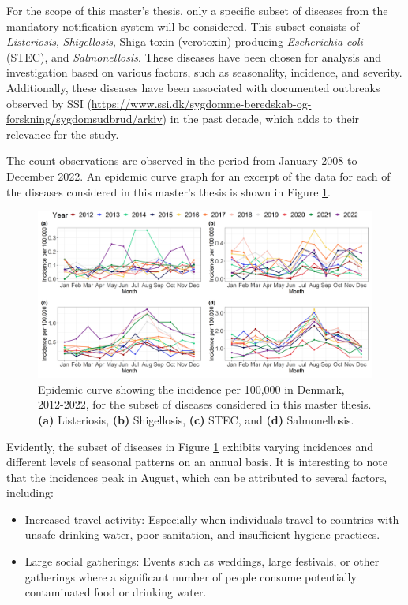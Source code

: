 \documentclass[a4paper,twoside,11pt]{report} %
\theoremstyle{definition}
\theoremstyle{definition}
\theoremstyle{definition}
\theoremstyle{definition}
\theoremstyle{remark}
\begin{document}
For the scope of this master's thesis, only a specific subset of diseases from the mandatory notification system will be considered. This subset consists of \textit{Listeriosis}, \textit{Shigellosis}, Shiga toxin (verotoxin)-producing \textit{Escherichia coli} (STEC), and \textit{Salmonellosis}. These diseases have been chosen for analysis and investigation based on various factors, such as seasonality, incidence, and severity. Additionally, these diseases have been associated with documented outbreaks observed by SSI (\href{https://www.ssi.dk/sygdomme-beredskab-og-forskning/sygdomsudbrud/arkiv}{https://www.ssi.dk/sygdomme-beredskab-og-forskning/sygdomsudbrud/arkiv}) in the past decade, which adds to their relevance for the study.

The count observations are observed in the period from January 2008 to December 2022. An epidemic curve graph for an excerpt of the data for each of the diseases considered in this master's thesis is shown in Figure \ref{fig:EpiPlot}.



\begin{figure}[H]
\includegraphics[width=1\linewidth]{../figures/EpiPlot} \caption{Epidemic curve showing the incidence per 100,000 in Denmark, 2012-2022, for the subset of diseases considered in this master thesis. \textbf{(a)} Listeriosis, \textbf{(b)} Shigellosis, \textbf{(c)} STEC, and \textbf{(d)} Salmonellosis.}\label{fig:EpiPlot}
\end{figure}

Evidently, the subset of diseases in Figure \ref{fig:EpiPlot} exhibits varying incidences and different levels of seasonal patterns on an annual basis. It is interesting to note that the incidences peak in August, which can be attributed to several factors, including:

\begin{itemize}
\item Increased travel activity: Especially when individuals travel to countries with unsafe drinking water, poor sanitation, and insufficient hygiene practices.
\item Large social gatherings: Events such as weddings, large festivals, or other gatherings where a significant number of people consume potentially contaminated food or drinking water.
\end{itemize}
\end{document}
